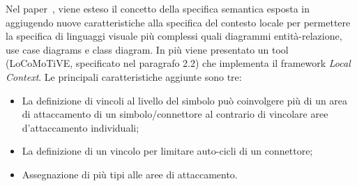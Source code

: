         

        \noindent
        Nel paper~\cite{extending_localcontext}, viene esteso il concetto della specifica semantica esposta in~\cite{localcontext_recognition} aggiugendo nuove caratteristiche alla specifica del contesto locale per permettere la specifica di linguaggi visuale più complessi quali diagrammi entità-relazione, use case diagrams e class diagram. In più viene presentato un tool (LoCoMoTiVE, specificato nel paragrafo 2.2) che implementa il framework \textit{Local Context}.
        \newline
        Le principali caratteristiche aggiunte sono tre:
        \begin{itemize}
            \item La definizione di vincoli al livello del simbolo può coinvolgere più di un area di attaccamento di un simbolo/connettore al contrario di vincolare aree d'attaccamento individuali;
            \item La definizione di un vincolo per limitare auto-cicli di un connettore;
            \item Assegnazione di più tipi alle aree di attaccamento.
        \end{itemize}

